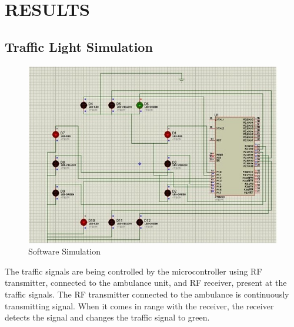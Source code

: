 \documentclass[12pt,a4paper,oneside,openright]{report}
\begin{document}
\chapter{RESULTS}
\section{Traffic Light Simulation}
\begin{figure}[!h]
 \centering
 \includegraphics[width = \textwidth]{Figures/26.jpg}
 \caption{Software Simulation}
 \label{Software Simulation}
\end{figure}
The traffic signals are being controlled by the microcontroller using RF transmitter, connected to the ambulance unit, and RF receiver, present at the traffic signals. The RF transmitter connected to the ambulance is continuously transmitting signal. When it comes in range with the receiver, the receiver detects the signal and changes the traffic signal to green.
\end{document}

